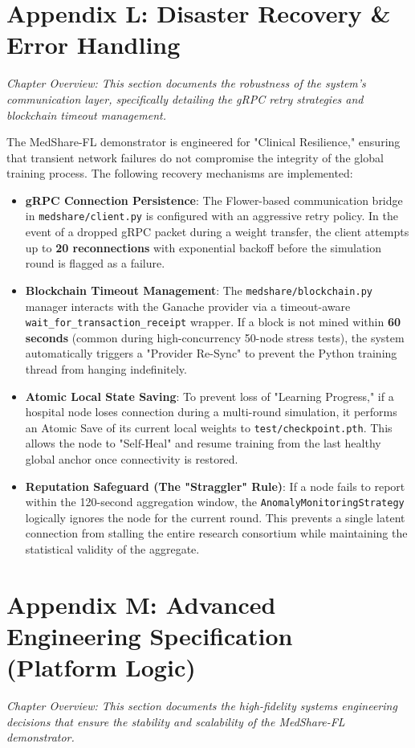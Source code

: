 \documentclass[10pt, a4paper, twocolumn]{article}
\begin{document}
\section*{Appendix L: Disaster Recovery \& Error Handling}
\textit{Chapter Overview: This section documents the robustness of the system's communication layer, specifically detailing the gRPC retry strategies and blockchain timeout management.}

The MedShare-FL demonstrator is engineered for "Clinical Resilience," ensuring that transient network failures do not compromise the integrity of the global training process. The following recovery mechanisms are implemented:

\begin{itemize}[leftmargin=1.5em]
    \item \textbf{gRPC Connection Persistence}: The Flower-based communication bridge in \texttt{medshare/client.py} is configured with an aggressive retry policy. In the event of a dropped gRPC packet during a weight transfer, the client attempts up to \textbf{20 reconnections} with exponential backoff before the simulation round is flagged as a failure.
    \item \textbf{Blockchain Timeout Management}: The \texttt{medshare/blockchain.py} manager interacts with the Ganache provider via a timeout-aware \texttt{wait\_for\_transaction\_receipt} wrapper. If a block is not mined within \textbf{60 seconds} (common during high-concurrency 50-node stress tests), the system automatically triggers a "Provider Re-Sync" to prevent the Python training thread from hanging indefinitely.
    \item \textbf{Atomic Local State Saving}: To prevent loss of "Learning Progress," if a hospital node loses connection during a multi-round simulation, it performs an Atomic Save of its current local weights to \texttt{test/checkpoint.pth}. This allows the node to "Self-Heal" and resume training from the last healthy global anchor once connectivity is restored.
    \item \textbf{Reputation Safeguard (The "Straggler" Rule)}: If a node fails to report within the 120-second aggregation window, the \texttt{AnomalyMonitoringStrategy} logically ignores the node for the current round. This prevents a single latent connection from stalling the entire research consortium while maintaining the statistical validity of the aggregate.
\end{itemize}

\section*{Appendix M: Advanced Engineering Specification (Platform Logic)}
\textit{Chapter Overview: This section documents the high-fidelity systems engineering decisions that ensure the stability and scalability of the MedShare-FL demonstrator.}
\end{document}
